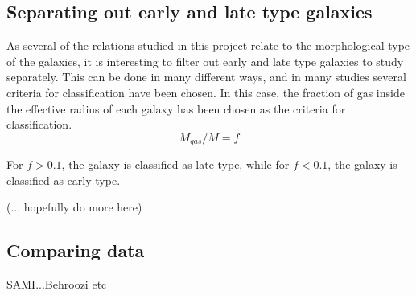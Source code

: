 \subsection{Separating out early and late type galaxies}
As several of the relations studied in this project relate to the morphological type of the galaxies, it is interesting to filter out early and late type galaxies to study separately. This can be done in many different ways, and in many studies several criteria for classification have been chosen. In this case, the fraction of gas inside the effective radius of each galaxy has been chosen as the criteria for classification.
\begin{equation}
    M_{gas}/M  = f
\end{equation}

For $f > 0.1$, the galaxy is classified as late type, while for $f< 0.1$, the galaxy is classified as early type.

(... hopefully do more here)

\subsection{Comparing data}
SAMI...Behroozi etc